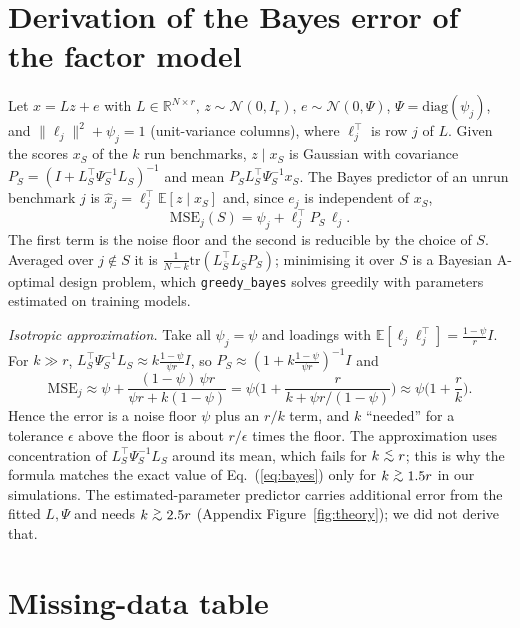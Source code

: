 \documentclass{article}
\providecommand{\gtrsim}{\mathrel{\raisebox{-0.5ex}{$\stackrel{>}{\sim}$}}}
\providecommand{\lesssim}{\mathrel{\raisebox{-0.5ex}{$\stackrel{<}{\sim}$}}}
\begin{document}





\appendix
\section{Derivation of the Bayes error of the factor model}
\label{app:theory}
Let $x=Lz+e$ with $L\in\mathbb R^{N\times r}$, $z\sim\mathcal N(0,I_r)$, $e\sim\mathcal N(0,\Psi)$, $\Psi=\mathrm{diag}(\psi_j)$, and $\|\ell_j\|^2+\psi_j=1$ (unit-variance columns), where $\ell_j^\top$ is row $j$ of $L$. Given the scores $x_S$ of the $k$ run benchmarks, $z\mid x_S$ is Gaussian with covariance $P_S=(I+L_S^\top\Psi_S^{-1}L_S)^{-1}$ and mean $P_SL_S^\top\Psi_S^{-1}x_S$. The Bayes predictor of an unrun benchmark $j$ is $\hat x_j=\ell_j^\top\mathbb E[z\mid x_S]$ and, since $e_j$ is independent of $x_S$,
\begin{equation}
\mathrm{MSE}_j(S)=\psi_j+\ell_j^\top P_S\,\ell_j .\label{eq:bayes}
\end{equation}
The first term is the noise floor and the second is reducible by the choice of $S$. Averaged over $j\notin S$ it is $\frac1{N-k}\mathrm{tr}(L_{\bar S}^\top L_{\bar S}P_S)$; minimising it over $S$ is a Bayesian A-optimal design problem, which \texttt{greedy\_bayes} solves greedily with parameters estimated on training models.

\emph{Isotropic approximation.} Take all $\psi_j=\psi$ and loadings with $\mathbb E[\ell_j\ell_j^\top]=\frac{1-\psi}{r}I$. For $k\gg r$, $L_S^\top\Psi_S^{-1}L_S\approx k\frac{1-\psi}{\psi r}I$, so $P_S\approx(1+k\frac{1-\psi}{\psi r})^{-1}I$ and
\[
\mathrm{MSE}_j\approx\psi+\frac{(1-\psi)\,\psi r}{\psi r+k(1-\psi)}=\psi\Big(1+\frac{r}{k+\psi r/(1-\psi)}\Big)\approx\psi\Big(1+\frac rk\Big).
\]
Hence the error is a noise floor $\psi$ plus an $r/k$ term, and $k$ ``needed'' for a tolerance $\epsilon$ above the floor is about $r/\epsilon$ times the floor. The approximation uses concentration of $L_S^\top\Psi_S^{-1}L_S$ around its mean, which fails for $k\lesssim r$; this is why the formula matches the exact value of Eq.~(\ref{eq:bayes}) only for $k\gtrsim1.5r$ in our simulations. The estimated-parameter predictor carries additional error from the fitted $L,\Psi$ and needs $k\gtrsim2.5r$ (Appendix Figure~\ref{fig:theory}); we did not derive that.



\section{Missing-data table}
\begin{table}[h]
\caption{Missing data (MTEB, ridge): reference error and skill for dense cores with extra random masking of a fixed $126\times238$ task set (so only missingness varies) and for the naturally sparse $258\times386$ matrix (a different benchmark pool, not a controlled comparison); last columns: $k$ needed for skill $\ge0.9$ of the reference skill, random / greedy-ridge selection.}
\label{tab:missing}
\centering\scriptsize
\resizebox{\linewidth}{!}{}
\end{table}
\end{document}
